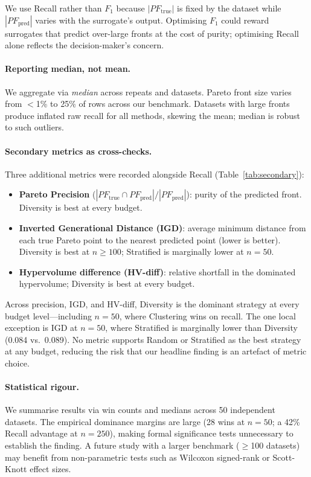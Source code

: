 \documentclass[sigconf,nonacm]{acmart}
\begin{document}
We use Recall rather than $F_1$ because $|PF_\text{true}|$ is fixed by the
dataset while $|PF_\text{pred}|$ varies with the surrogate's output.
Optimising $F_1$ could reward surrogates that predict over-large fronts at the
cost of purity; optimising Recall alone reflects the decision-maker's concern.

\paragraph{Reporting median, not mean.}
We aggregate via \emph{median} across repeats and datasets.
Pareto front size varies from $<$1\% to 25\% of rows across our benchmark.
Datasets with large fronts produce inflated raw recall for all methods,
skewing the mean; median is robust to such outliers.

\paragraph{Secondary metrics as cross-checks.}
Three additional metrics were recorded alongside Recall (Table~\ref{tab:secondary}):
\begin{itemize}[leftmargin=*]
  \item \textbf{Pareto Precision}
  ($|PF_\text{true} \cap PF_\text{pred}|/|PF_\text{pred}|$):
  purity of the predicted front.
  Diversity is best at every budget.
  \item \textbf{Inverted Generational Distance (IGD)}: average minimum
  distance from each true Pareto point to the nearest predicted point
  (lower is better).
  Diversity is best at $n\geq100$; Stratified is marginally lower at $n=50$.
  \item \textbf{Hypervolume difference (HV-diff)}: relative shortfall in the
  dominated hypervolume; Diversity is best at every budget.
\end{itemize}
Across precision, IGD, and HV-diff, Diversity is the dominant strategy at
every budget level---including $n=50$, where Clustering wins on recall.
The one local exception is IGD at $n=50$, where Stratified is marginally
lower than Diversity (0.084 vs.\ 0.089).
No metric supports Random or Stratified as the best strategy at any budget,
reducing the risk that our headline finding is an artefact of metric choice.

\paragraph{Statistical rigour.}
We summarise results via win counts and medians across 50 independent datasets.
The empirical dominance margins are large (28 wins at $n=50$; a 42\% Recall
advantage at $n=250$), making formal significance tests unnecessary to
establish the finding.
A future study with a larger benchmark ($\geq$100 datasets) may benefit from
non-parametric tests such as Wilcoxon signed-rank or Scott-Knott effect sizes.
\end{document}
